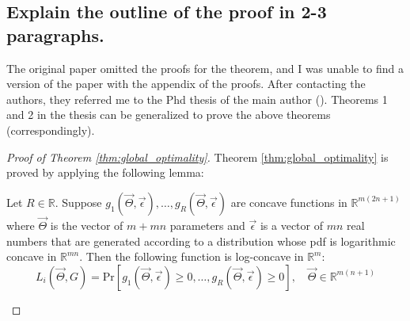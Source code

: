 \subsection{
    Explain the outline of the proof in 2-3 paragraphs.
}

The original paper omitted the proofs for the theorem, and I was unable to find a version of the paper with the appendix of the proofs.
After contacting the authors, they referred me to the Phd thesis of the main author (\cite{soufiani2014revisiting}).
Theorems 1 and 2 in the thesis can be generalized to prove the above theorems (correspondingly).

\begin{proof}[Proof of Theorem \ref{thm:global_optimality}]
    Theorem \ref{thm:global_optimality} is proved by applying the following lemma:
    \begin{lemma} \label{lem:1}
        Let $R \in \mathbb{R}$. Suppose $g_{1}(\vec{\Theta},\vec{\epsilon}),\dots,g_{R}(\vec{\Theta},\vec{\epsilon})$ are concave functions in $\mathbb{R}^{m(2n+1)}$ where $\vec{\Theta}$ is the vector of $m+mn$ parameters and $\vec{\epsilon}$ is a vector of $mn$ real numbers that are generated according to a distribution whose pdf is logarithmic concave in $\mathbb{R}^{mn}$. Then the following function is log-concave in $\mathbb{R}^{m}$:
        \begin{equation*}
        L_{i} (\vec{\Theta},G) =
        \mathrm{Pr} \left[
          g_{1}(\vec{\Theta},\vec{\epsilon}) \geq 0,\dots,g_{R}(\vec{\Theta},\vec{\epsilon}) \geq 0
        \right],\quad 
        \vec{\Theta} \in \mathbb{R}^{m(n+1)}
        \end{equation*}
    \end{lemma}
    

\end{proof}
